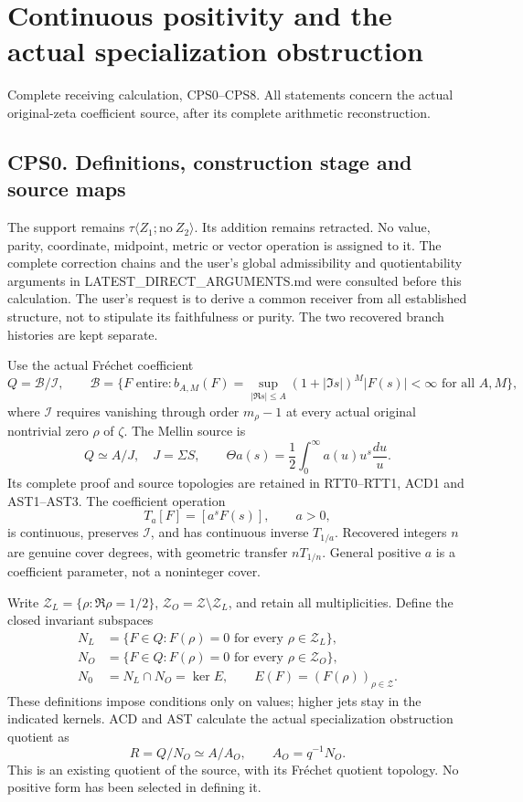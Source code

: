 \chapter{Continuous positivity and the actual specialization
obstruction}\label{continuous-positivity-and-the-actual-specialization-obstruction}

Complete receiving calculation, CPS0--CPS8. All statements concern the
actual original-zeta coefficient source, after its complete arithmetic
reconstruction.

\section{CPS0. Definitions, construction stage and source
maps}\label{cps0.-definitions-construction-stage-and-source-maps}

The support remains \(\tau\langle Z_1;\mathrm{no}\ Z_2\rangle\). Its
addition remains retracted. No value, parity, coordinate, midpoint,
metric or vector operation is assigned to it. The complete correction
chains and the user's global admissibility and quotientability arguments
in LATEST\_DIRECT\_ARGUMENTS.md were consulted before this calculation.
The user's request is to derive a common receiver from all established
structure, not to stipulate its faithfulness or purity. The two
recovered branch histories are kept separate.

Use the actual Fréchet coefficient \[
Q=\mathcal B/\mathcal I,\qquad
\mathcal B=\{F\text{ entire}:b_{A,M}(F)=
\sup_{|\Re s|\le A}(1+|\Im s|)^M|F(s)|<\infty
\text{ for all }A,M\},
\tag{CPS0.1}
\] where \(\mathcal I\) requires vanishing through order \(m_\rho-1\) at
every actual original nontrivial zero \(\rho\) of \(\zeta\). The Mellin
source is \[
Q\simeq A/J,\quad J=\Sigma S,\qquad
\Theta a(s)=\frac12\int_0^\infty a(u)u^s\frac{du}{u}.
\tag{CPS0.2}
\] Its complete proof and source topologies are retained in RTT0--RTT1,
ACD1 and AST1--AST3. The coefficient operation \[
T_a[F]=[a^sF(s)],\qquad a>0,
\tag{CPS0.3}
\] is continuous, preserves \(\mathcal I\), and has continuous inverse
\(T_{1/a}\). Recovered integers \(n\) are genuine cover degrees, with
geometric transfer \(nT_{1/n}\). General positive \(a\) is a coefficient
parameter, not a noninteger cover.

Write \(\mathscr Z_L=\{\rho:\Re\rho=1/2\}\),
\(\mathscr Z_O=\mathscr Z\setminus\mathscr Z_L\), and retain all
multiplicities. Define the closed invariant subspaces \[
\begin{split}
N_L&=\{F\in Q:F(\rho)=0\text{ for every }\rho\in\mathscr Z_L\},\\
N_O&=\{F\in Q:F(\rho)=0\text{ for every }\rho\in\mathscr Z_O\},\\
N_0&=N_L\cap N_O=\ker E,
\qquad E(F)=(F(\rho))_{\rho\in\mathscr Z}.
\end{split}
\tag{CPS0.4}
\] These definitions impose conditions only on values; higher jets stay
in the indicated kernels. ACD and AST calculate the actual
specialization obstruction quotient as \[
R=Q/N_O\simeq A/A_O,\qquad A_O=q^{-1}N_O.
\tag{CPS0.5}
\] This is an existing quotient of the source, with its Fréchet quotient
topology. No positive form has been selected in defining it.

